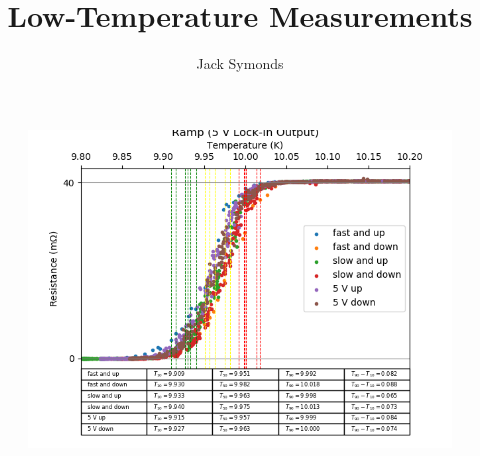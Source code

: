\documentclass[8pt, a4paper]{article}
\title{Low-Temperature Measurements}
\author{Jack Symonds}
\date{}
\begin{document}
\begin{figure}[h!]
\includegraphics{superchl.png}
\end{figure}

\newpage

\end{document}
